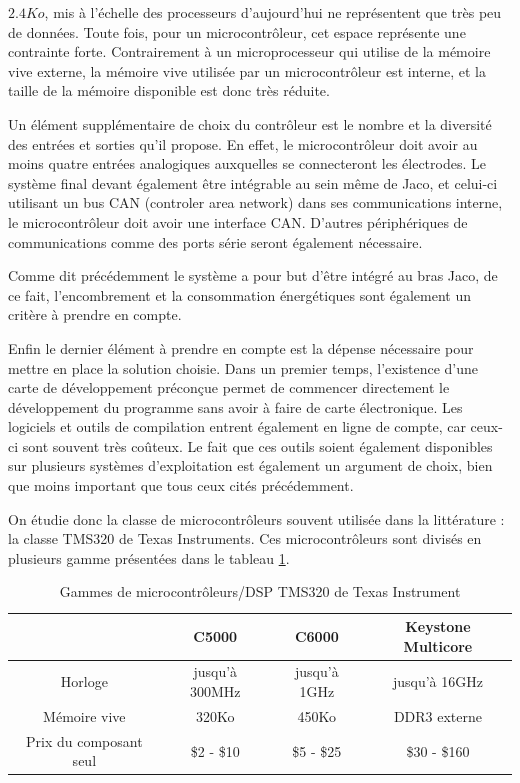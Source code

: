 \documentclass[letterpaper, twoside, 12pt, memoire, creativecommons, hyperref]{thETS}
\begin{document}
$2.4Ko$, mis à l'échelle des processeurs d'aujourd'hui ne représentent que très peu de données. Toute fois, pour un microcontrôleur, cet espace représente une contrainte forte. Contrairement à un microprocesseur qui utilise de la mémoire vive externe, la mémoire vive utilisée par un microcontrôleur est interne, et la taille de la mémoire disponible est donc très réduite. 

Un élément supplémentaire de choix du contrôleur est le nombre et la diversité des entrées et sorties qu'il propose. En effet, le microcontrôleur doit avoir au moins quatre entrées analogiques auxquelles se connecteront les électrodes. Le système final devant également être intégrable au sein même de Jaco, et celui-ci utilisant un bus CAN (controler area network) dans ses communications interne, le microcontrôleur doit avoir une interface CAN. D'autres périphériques de communications comme des ports série seront également nécessaire. 

Comme dit précédemment le système a pour but d'être intégré au bras Jaco, de ce fait, l'encombrement et la consommation énergétiques sont également un critère à prendre en compte.

Enfin le dernier élément à prendre en compte est la dépense nécessaire pour mettre en place la solution choisie. Dans un premier temps, l'existence d'une carte de développement préconçue permet de commencer directement le développement du programme sans avoir à faire de carte électronique. Les logiciels et outils de compilation entrent également en ligne de compte, car ceux-ci sont souvent très coûteux. Le fait que ces outils soient également disponibles sur plusieurs systèmes d'exploitation est également un argument de choix, bien que moins important que tous ceux cités précédemment. 

On étudie donc la classe de microcontrôleurs souvent utilisée dans la littérature : la classe TMS320 de Texas Instruments.
Ces microcontrôleurs sont divisés en plusieurs gamme présentées dans le tableau \ref{tab:tms320}.

\begin{table}[ht]
	\caption{Gammes de microcontrôleurs/DSP TMS320 de Texas Instrument }
		\begin{tabular}{|c|c|c|c|}
		\hline
			& C5000 & C6000 & Keystone Multicore\\
	    \hline
	    	Horloge & jusqu'à 300MHz & jusqu'à 1GHz & jusqu'à 16GHz\\
	    \hline
			Mémoire vive & 320Ko & 450Ko & DDR3 externe\\
	    \hline
	    	Prix du composant seul & \$2 - \$10 & \$5 - \$25 & \$30 - \$160\\
	    \hline
		\end{tabular}
	\label{tab:tms320}
\end{table}
\end{document}
